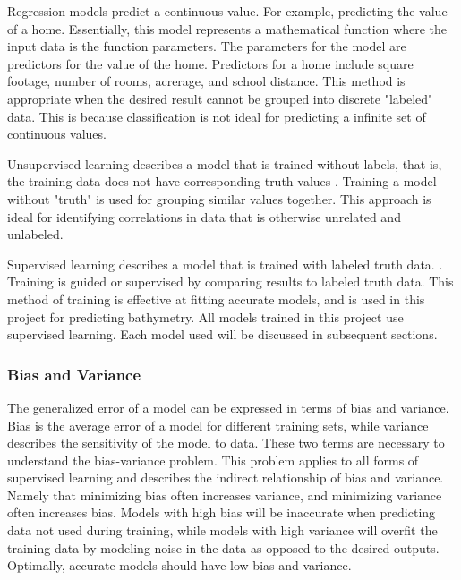 \par
Regression models predict a continuous value.
For example, predicting the value of a home.
Essentially, this model represents a mathematical function where the input data is the function parameters.
The parameters for the model are predictors for the value of the home.
Predictors for a home include square footage, number of rooms, acrerage, and school distance.
This method is appropriate when the desired result cannot be grouped into discrete "labeled" data.
This is because classification is not ideal for predicting a infinite set of continuous values.

\par
Unsupervised learning describes a model that is trained without labels, that is, the training data does not have corresponding truth values \cite{bishop2006pattern}.
Training a model without "truth" is used for grouping similar values together.
This approach is ideal for identifying correlations in data that is otherwise unrelated and unlabeled.

\par
Supervised learning describes a model that is trained with labeled truth data. \cite{bishop2006pattern}.
Training is guided or supervised by comparing results to labeled truth data.
This method of training is effective at fitting accurate models, and is used in this project for predicting bathymetry.
All models trained in this project use supervised learning.
Each model used will be discussed in subsequent sections.

\subsubsection{Bias and Variance}
The generalized error of a model can be expressed in terms of bias and variance.
Bias is the average error of a model for different training sets, while variance describes the sensitivity of the model to data.
These two terms are necessary to understand the bias-variance problem.
This problem applies to all forms of supervised learning \cite{geman1992neural} and describes the indirect relationship of bias and variance.
Namely that minimizing bias often increases variance, and minimizing variance often increases bias.
Models with high bias will be inaccurate when predicting data not used during training, while models with high variance will overfit \cite{cawley2010over} the training data by modeling noise in the data as opposed to the desired outputs.
Optimally, accurate models should have low bias and variance.

